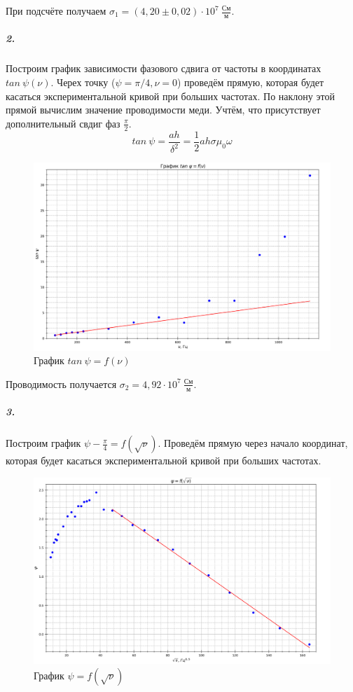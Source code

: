 \documentclass[a4paper,12pt]{article}
\begin{document}
При подсчёте получаем $\sigma_1 = (4,20\pm 0,02)\cdot 10^7~\frac{См}{м}$.
\subparagraph{2.} 
Построим график зависимости фазового сдвига от частоты в координатах $tan~\psi(\nu)$. Черех точку ($\psi = \pi/4, \nu = 0$) проведём прямую, которая будет касаться экспериментальной кривой при больших частотах. По наклону этой прямой вычислим значение проводимости меди. Учтём, что присутствует дополнительный свдиг фаз $\frac{\pi}{2}$.
\begin{equation}
    tan~\psi =\frac{ah}{\delta^2}=\frac{1}{2}ah\sigma \mu_0 \omega
\end{equation}
\newpage
\begin{figure}[!h]
\centering
\includegraphics[width=0.9\linewidth]{graph2.png}
\caption{График $tan ~ \psi = f(\nu)$}
\label{fig:mpr}
\end{figure}
Проводимость получается $\sigma_2 = 4,92 \cdot 10^7 ~\frac{См}{м}$.
\subparagraph{3.} Построим график $\psi - \frac{\pi}{4}=f(\sqrt{\nu})$. Проведём прямую через начало координат, которая будет касаться экспериментальной кривой при больших частотах.
\begin{figure}[!h]
\centering
\includegraphics[width=0.9\linewidth]{graph3.png}
\caption{График $\psi = f(\sqrt{\nu})$}
\label{fig:mpr}
\end{figure}
\end{document}
